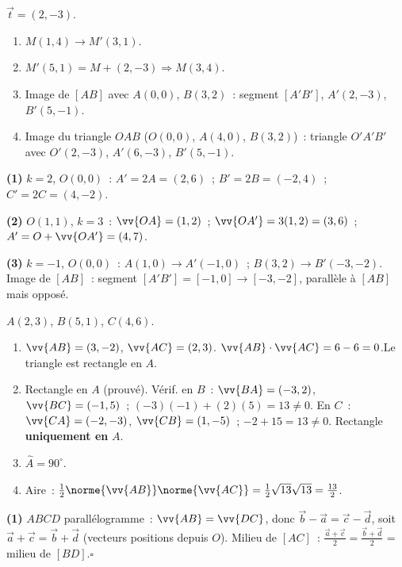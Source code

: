 
$\vec{t}=(2,-3)$.
\begin{enumerate}
  \item $M(1,4)\to M'(3,1)$.
  \item $M'(5,1)=M+(2,-3)\Rightarrow M(3,4)$.
  \item Image de $[AB]$ avec $A(0,0)$, $B(3,2)$~: segment $[A'B']$, $A'(2,-3)$, $B'(5,-1)$.
  \item Image du triangle $OAB$ ($O(0,0)$, $A(4,0)$, $B(3,2)$)~: triangle $O'A'B'$ avec $O'(2,-3)$, $A'(6,-3)$, $B'(5,-1)$.
\end{enumerate}


\textbf{(1)} $k=2$, $O(0,0)$~: $A'=2A=(2,6)$~; $B'=2B=(-2,4)$~; $C'=2C=(4,-2)$.

\textbf{(2)} $O(1,1)$, $k=3$~: $\vv{OA}=(1,2)$~; $\vv{OA'}=3(1,2)=(3,6)$~;
$A'=O+\vv{OA'}=(4,7)$.

\textbf{(3)} $k=-1$, $O(0,0)$~: $A(1,0)\to A'(-1,0)$~; $B(3,2)\to B'(-3,-2)$.
Image de $[AB]$~: segment $[A'B']=[-1,0]\to[-3,-2]$, parall\`ele \`a $[AB]$ mais oppos\'e.


$A(2,3)$, $B(5,1)$, $C(4,6)$.
\begin{enumerate}
  \item $\vv{AB}=(3,-2)$, $\vv{AC}=(2,3)$.
        $\vv{AB}\cdot\vv{AC}=6-6=0$.\checkmark\quad Le triangle est rectangle en $A$.
  \item Rectangle en $A$ (prouv\'e). V\'erif. en $B$~: $\vv{BA}=(-3,2)$, $\vv{BC}=(-1,5)$~;
        $(-3)(-1)+(2)(5)=13\ne0$. En $C$~: $\vv{CA}=(-2,-3)$, $\vv{CB}=(1,-5)$~;
        $-2+15=13\ne0$. Rectangle \textbf{uniquement en} $A$.
  \item $\hat{A}=90^{\circ}$.
  \item Aire~: $\frac{1}{2}\norme{\vv{AB}}\norme{\vv{AC}}=\frac{1}{2}\sqrt{13}\sqrt{13}=\frac{13}{2}$.
\end{enumerate}


\textbf{(1)} $ABCD$ parall\'elogramme~: $\vv{AB}=\vv{DC}$, donc $\vec{b}-\vec{a}=\vec{c}-\vec{d}$,
soit $\vec{a}+\vec{c}=\vec{b}+\vec{d}$ (vecteurs positions depuis $O$).
Milieu de $[AC]$~: $\frac{\vec{a}+\vec{c}}{2}=\frac{\vec{b}+\vec{d}}{2}$ = milieu de $[BD]$.\hfill$\square$


